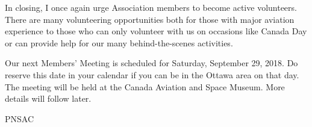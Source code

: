 In closing, I once again urge Association members to become active volunteers.
There are many volunteering opportunities both for those with major aviation
experience to those who can only volunteer with us on occasions like Canada Day
or can provide help for our many behind-the-scenes activities.

Our next Members' Meeting is scheduled for
Saturday, September 29, 2018. Do reserve this date in your calendar if you can
be in the Ottawa area on that day. The meeting will be held at the Canada
Aviation and Space Museum. More details will follow later.

\begin{footnotesize}
    \raggedleft PNSAC\\
\end{footnotesize}



